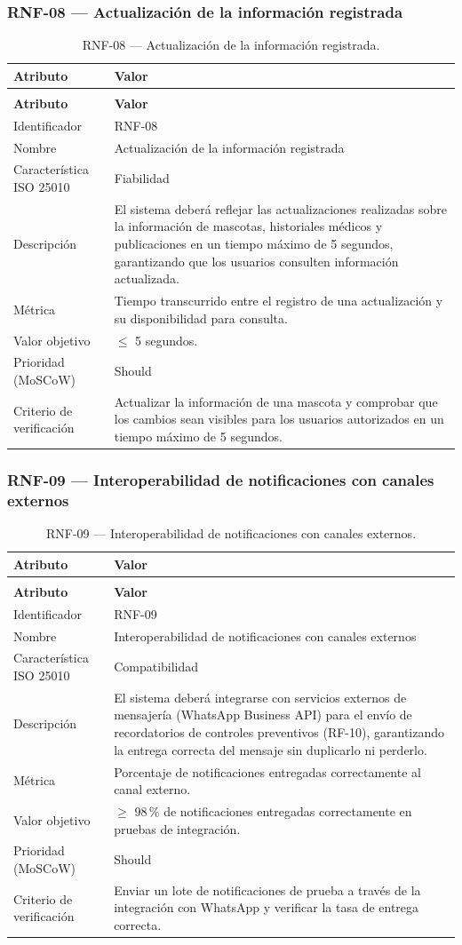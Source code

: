 \documentclass[journal,onecolumn]{IEEEtran}
\makeatletter
\newenvironment{atributos}[2]{%
	\small
	\begin{longtable}{@{}>{\raggedright\arraybackslash}p{4.2cm} >{\raggedright\arraybackslash}p{11.2cm}@{}}
		\caption{#2}\label{tab:#1}\\
		\toprule
		\textbf{Atributo} & \textbf{Valor} \\
		\midrule
		\endfirsthead
		\multicolumn{2}{@{}l}{\small\itshape (continuación)}\\
		\toprule
		\textbf{Atributo} & \textbf{Valor} \\
		\midrule
		\endhead
		\bottomrule
		\endlastfoot
	}{%
	\end{longtable}
	\normalsize
}
\makeatother
\begin{document}
	\subsubsection{RNF-08 --- Actualización de la información registrada}
	
	\begin{atributos}{RNF-08}{RNF-08 --- Actualización de la información registrada.}
		Identificador & RNF-08 \\
		Nombre & Actualización de la información registrada \\
		Característica ISO 25010 & Fiabilidad \\
		Descripción & El sistema deberá reflejar las actualizaciones realizadas sobre la información de mascotas, historiales médicos y publicaciones en un tiempo máximo de 5 segundos, garantizando que los usuarios consulten información actualizada. \\
		Métrica & Tiempo transcurrido entre el registro de una actualización y su disponibilidad para consulta. \\
		Valor objetivo & $\leq$ 5 segundos. \\
		Prioridad (MoSCoW) & Should \\
		Criterio de verificación & Actualizar la información de una mascota y comprobar que los cambios sean visibles para los usuarios autorizados en un tiempo máximo de 5 segundos. \\
	\end{atributos}
	
	\subsubsection{RNF-09 --- Interoperabilidad de notificaciones con canales externos}
	
	\begin{atributos}{RNF-09}{RNF-09 --- Interoperabilidad de notificaciones con canales externos.}
		Identificador & RNF-09 \\
		Nombre & Interoperabilidad de notificaciones con canales externos \\
		Característica ISO 25010 & Compatibilidad \\
		Descripción & El sistema deberá integrarse con servicios externos de mensajería (WhatsApp Business API) para el envío de recordatorios de controles preventivos (RF-10), garantizando la entrega correcta del mensaje sin duplicarlo ni perderlo. \\
		Métrica & Porcentaje de notificaciones entregadas correctamente al canal externo. \\
		Valor objetivo & $\geq$ 98\,\% de notificaciones entregadas correctamente en pruebas de integración. \\
		Prioridad (MoSCoW) & Should \\
		Criterio de verificación & Enviar un lote de notificaciones de prueba a través de la integración con WhatsApp y verificar la tasa de entrega correcta. \\
	\end{atributos}
	
\end{document}

